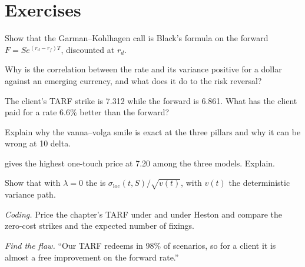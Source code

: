 \section{Exercises}

\begin{exercise}[$\star$]\label{exo:dv:fx-derivatives:1}
Show that the Garman--Kohlhagen call is Black's formula on the forward $F=Se^{(r_d-r_f)T}$, discounted at $r_d$.
\end{exercise}

\begin{exercise}[$\star$]\label{exo:dv:fx-derivatives:2}
Why is the correlation between the rate and its variance positive for a dollar against an emerging currency, and what does it do to the risk
reversal?
\end{exercise}

\begin{exercise}[$\star$]\label{exo:dv:fx-derivatives:3}
The client's TARF strike is 7.312 while the forward is 6.861. What has the client paid for a rate 6.6\% better than the forward?
\end{exercise}

\begin{exercise}[$\star\star$]\label{exo:dv:fx-derivatives:4}
Explain why the vanna--volga smile is exact at the three pillars and why it can be wrong at 10 delta.
\end{exercise}

\begin{exercise}[$\star\star$]\label{exo:dv:fx-derivatives:5}
 gives the highest one-touch price at 7.20 among the three models. Explain.
\end{exercise}

\begin{exercise}[$\star\star$]\label{exo:dv:fx-derivatives:6}
Show that with $\lambda=0$ the  is $\sigma_{\mathrm{loc}}(t,S)/\sqrt{v(t)}$, with $v(t)$ the deterministic variance path.
\end{exercise}

\begin{exercise}[$\star\star\star$]\label{exo:dv:fx-derivatives:7}
\emph{Coding.} Price the chapter's TARF under  and under Heston and compare the zero-cost strikes and the expected number of
fixings.
\end{exercise}

\begin{exercise}[$\star\star\star$]\label{exo:dv:fx-derivatives:8}
\emph{Find the flaw.} ``Our TARF redeems in 98\% of scenarios, so for a client it is almost a free improvement on the forward rate.''
\end{exercise}

